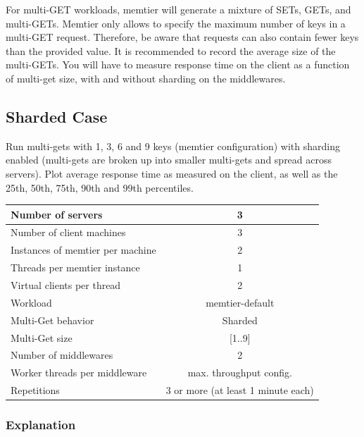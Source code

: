\documentclass[11pt,a4paper]{article}
\begin{document}
For multi-GET workloads, memtier will generate a mixture of SETs, GETs, and multi-GETs. Memtier only allows to specify the maximum number of keys in a multi-GET request. Therefore, be aware that requests can also contain fewer keys than the provided value. It is recommended to record the average size of the multi-GETs. You will have to measure response time on the client as a function of multi-get size, with and without sharding on the middlewares.

\subsection{Sharded Case}

Run multi-gets with 1, 3, 6 and 9 keys (memtier configuration) with sharding enabled (multi-gets are broken up into smaller multi-gets and spread across servers). Plot average response time as measured on the client, as well as the 25th, 50th, 75th, 90th and 99th percentiles.

\begin{center}
	\scriptsize{
		\begin{tabular}{|l|c|}
			\hline Number of servers                & 3                       \\
			\hline Number of client machines        & 3                       \\
			\hline Instances of memtier per machine & 2                       \\
			\hline Threads per memtier instance     & 1                       \\
			\hline Virtual clients per thread       & 2     		            \\
			\hline Workload                         & memtier-default             \\
			\hline Multi-Get behavior               & Sharded                 \\
			\hline Multi-Get size                   & [1..9]                  \\
			\hline Number of middlewares            & 2                       \\
			\hline Worker threads per middleware    & max. throughput config. \\
			\hline Repetitions                      & 3 or more (at least 1 minute each)               \\
			\hline
		\end{tabular}
	}
\end{center}

\subsubsection{Explanation}
\end{document}
